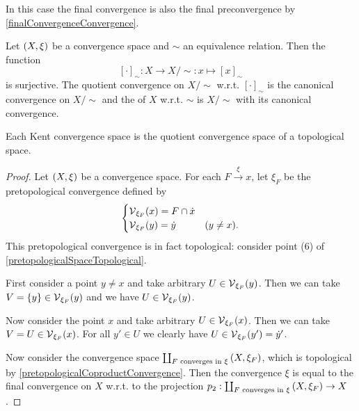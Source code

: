 In this case the final convergence is also the final preconvergence by \ref{finalConvergenceConvergence}.

\begin{example}
Let $\sSet{X,\xi}$ be a convergence space and $\sim$ an equivalence relation. Then the function
\[ [\cdot]_\sim: X\to X/{\sim}: x\mapsto [x]_\sim \]
is surjective. The quotient convergence on $X/{\sim}$ w.r.t. $[\cdot]_\sim$ is the canonical convergence on $X/{\sim}$ and the  of $X$ w.r.t. $\sim$ is $X/{\sim}$ with its canonical convergence.
\end{example}

\begin{proposition} \label{convergenceSpaceQuotientOfTopologicalSpace}
Each Kent convergence space is the quotient convergence space of a topological space.
\end{proposition}
\begin{proof}
Let $\sSet{X,\xi}$ be a convergence space. For each $F\overset{\xi}{\longrightarrow} x$, let $\xi_F$ be the pretopological convergence defined by
\[ \begin{cases}
\operatorname{\mathcal{V}}_{\xi_F}(x) = F \cap \dot{x}  \\
\operatorname{\mathcal{V}}_{\xi_F}(y) = \dot{y} & (y \neq x).
\end{cases} \]
This pretopological convergence is in fact topological: consider point (6) of \ref{pretopologicalSpaceTopological}.

First consider a point $y\neq x$ and take arbitrary $U\in \operatorname{\mathcal{V}}_{\xi_F}(y)$. Then we can take $V = \{y\} \in \operatorname{\mathcal{V}}_{\xi_F}(y)$ and we have $U\in \operatorname{\mathcal{V}}_{\xi_F}(y)$.

Now consider the point $x$ and take arbitrary $U\in \operatorname{\mathcal{V}}_{\xi_F}(x)$. Then we can take $V = U \in \operatorname{\mathcal{V}}_{\xi_F}(x)$. For all $y'\in U$ we clearly have $U\in \operatorname{\mathcal{V}}_{\xi_F}(y') = \dot{y}'$.

Now consider the convergence space $\coprod_{\text{$F$ converges in $\xi$}}\sSet{X, \xi_F}$, which is topological by \ref{pretopologicalCoproductConvergence}. Then the convergence $\xi$ is equal to the final convergence on $X$ w.r.t. to the projection $p_2: \coprod_{\text{$F$ converges in $\xi$}}\sSet{X, \xi_F} \to X$.
\end{proof}



